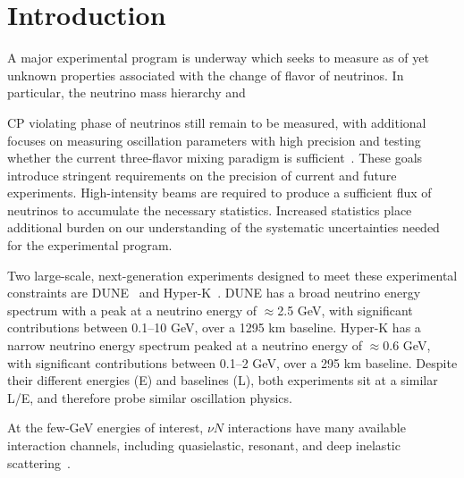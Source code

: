 \documentclass{ar-1col}
\begin{document}
\maketitle

\tableofcontents


\section{Introduction\label{sec:intro}}

A major experimental program is underway which seeks to measure
as of yet unknown properties associated with the change of flavor of neutrinos.
In particular, the neutrino mass hierarchy and%
\begin{marginnote}
\end{marginnote}%
CP violating phase
of neutrinos still remain to be measured, with additional focuses on measuring
oscillation parameters with high precision and testing whether the current
three-flavor mixing paradigm is sufficient~\cite{Esteban:2020cvm, ParticleDataGroup:2020ssz}.
These goals introduce stringent requirements on the precision of current and future experiments.
High-intensity beams are required to produce a sufficient flux of neutrinos to accumulate the necessary statistics.
Increased statistics place additional burden on our understanding of the systematic uncertainties needed for the experimental program.

Two large-scale, next-generation experiments designed to meet these experimental constraints
are
DUNE~\cite{Abi:2020wmh}
and
Hyper-K~\cite{Hyper-Kamiokande:2018ofw}.
DUNE has a broad neutrino energy spectrum with a peak at a neutrino energy of $\approx$2.5 GeV,
with significant contributions between 0.1--10 GeV, over a 1295 km baseline.
Hyper-K has a narrow neutrino energy spectrum peaked at a neutrino energy of $\approx$0.6 GeV, with significant
contributions between 0.1--2 GeV, over a 295 km baseline. Despite their different energies (E) and
baselines (L), both experiments sit at a similar L/E, and therefore probe similar oscillation physics.%
\begin{marginnote}
\end{marginnote}%
At the few-GeV energies of interest, $\nu N$ interactions have many available interaction channels,
including quasielastic, resonant, and deep inelastic scattering~\cite{zeller12, hayato_review_2014, Mosel:2016cwa, Katori:2016yel, NuSTEC:2017hzk}.
\end{document}
